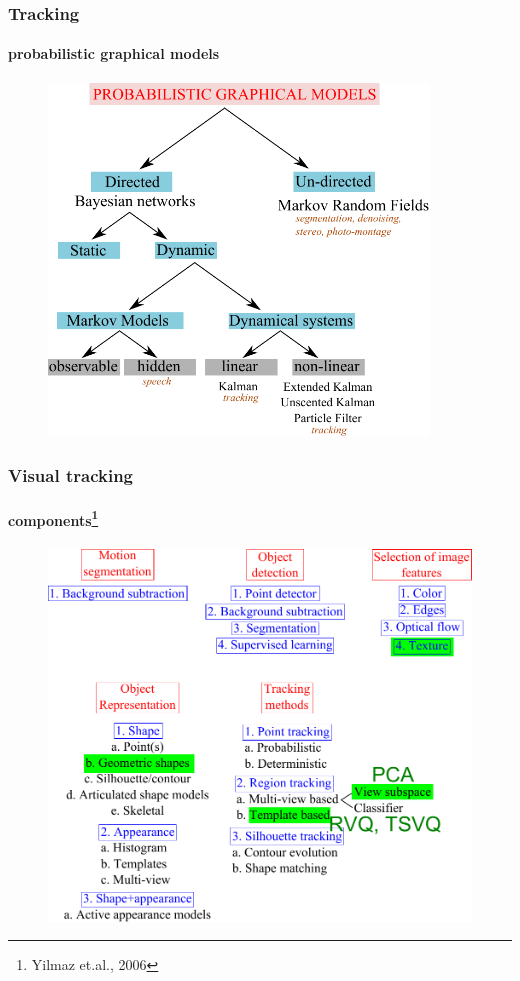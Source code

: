 \begin{frame}
\frametitle{Tracking}
\framesubtitle{probabilistic graphical models}
\mypagenum{}
	\begin{figure}
		\includegraphics[width=0.9\textwidth]{figs/PRML_PGM_overview.pdf}
	\end{figure}
\end{frame}



\begin{frame}
\frametitle{Visual tracking}
\framesubtitle{components\tiny{\footnote {Yilmaz et.al., 2006}}}
\mypagenum{}
\begin{figure}
\includegraphics[height=0.8\textheight]{figs/TRK_overview.pdf}
\end{figure}	
\end{frame}



